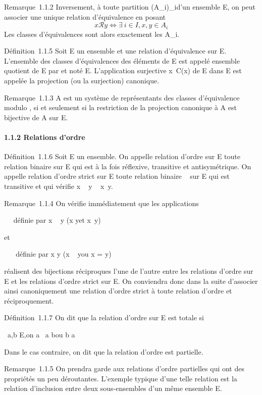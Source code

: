 Remarque~1.1.2 Inversement, à toute partition
(A_i)_i\inI d'un ensemble E, on peut associer une unique
relation d'équivalence en posant
\[
x\mathcal{R}y \Leftrightarrow \exists~i \in I, x,y \in
A_i
\]
Les classes d'équivalences sont alors exactement les A_i.

Définition~1.1.5 Soit E un ensemble et  une relation d'équivalence sur
E. L'ensemble des classes d'équivalences des éléments de E est appelé
ensemble quotient de E par  et noté E\diagup{}. L'application surjective
x\mapsto~C(x) de E dans E\diagup{} est appelée la
projection (ou la surjection) canonique.

Remarque~1.1.3 A est un système de représentants des classes
d'équivalence modulo , si et seulement si la restriction de la
projection canonique à A est bijective de A sur E\diagup{}.

\paragraph{1.1.2 Relations d'ordre}

Définition~1.1.6 Soit E un ensemble. On appelle relation d'ordre sur E
toute relation binaire \leqslant sur E qui est à la fois réflexive, transitive
et antisymétrique. On appelle relation d'ordre strict sur E toute
relation binaire \prec~ sur E qui est transitive et qui vérifie x \prec~ y \rigtharrow~
x\neq~y.

Remarque~1.1.4 On vérifie immédiatement que les applications

\leqslant \mapsto~ \prec~\text définie par x \prec~
y \Leftrightarrow (x \leqslant y\text et
x\neq~y)

et

\prec~ \mapsto~ \leqslant\text définie par x \leqslant
y \Leftrightarrow (x \prec~ y\text ou x = y)

réalisent des bijections réciproques l'une de l'autre entre les
relations d'ordre sur E et les relations d'ordre strict sur E. On
conviendra donc dans la suite d'associer ainsi canoniquement une
relation d'ordre strict à toute relation d'ordre et réciproquement.

Définition~1.1.7 On dit que la relation d'ordre \leqslant sur E est totale si

\forall~a,b \in E,\text on a ~a \leqslant
b\text ou b \leqslant a

Dans le cas contraire, on dit que la relation d'ordre est partielle.

Remarque~1.1.5 On prendra garde aux relations d'ordre partielles qui ont
des propriétés un peu déroutantes. L'exemple typique d'une telle
relation est la relation d'inclusion entre deux sous-ensembles d'un même
ensemble E.

